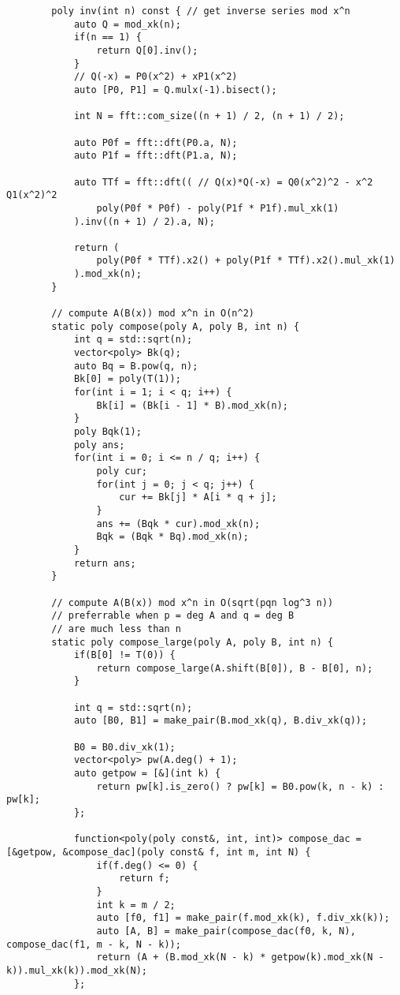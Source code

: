 \begin{lstlisting}
        poly inv(int n) const { // get inverse series mod x^n
            auto Q = mod_xk(n);
            if(n == 1) {
                return Q[0].inv();
            }
            // Q(-x) = P0(x^2) + xP1(x^2)
            auto [P0, P1] = Q.mulx(-1).bisect();
            
            int N = fft::com_size((n + 1) / 2, (n + 1) / 2);
            
            auto P0f = fft::dft(P0.a, N);
            auto P1f = fft::dft(P1.a, N);
            
            auto TTf = fft::dft(( // Q(x)*Q(-x) = Q0(x^2)^2 - x^2 Q1(x^2)^2
                poly(P0f * P0f) - poly(P1f * P1f).mul_xk(1)
            ).inv((n + 1) / 2).a, N);
            
            return (
                poly(P0f * TTf).x2() + poly(P1f * TTf).x2().mul_xk(1)
            ).mod_xk(n);
        }
        
        // compute A(B(x)) mod x^n in O(n^2)
        static poly compose(poly A, poly B, int n) {
            int q = std::sqrt(n);
            vector<poly> Bk(q);
            auto Bq = B.pow(q, n);
            Bk[0] = poly(T(1));
            for(int i = 1; i < q; i++) {
                Bk[i] = (Bk[i - 1] * B).mod_xk(n);
            }
            poly Bqk(1);
            poly ans;
            for(int i = 0; i <= n / q; i++) {
                poly cur;
                for(int j = 0; j < q; j++) {
                    cur += Bk[j] * A[i * q + j];
                }
                ans += (Bqk * cur).mod_xk(n);
                Bqk = (Bqk * Bq).mod_xk(n);
            }
            return ans;
        }
        
        // compute A(B(x)) mod x^n in O(sqrt(pqn log^3 n))
        // preferrable when p = deg A and q = deg B
        // are much less than n
        static poly compose_large(poly A, poly B, int n) {
            if(B[0] != T(0)) {
                return compose_large(A.shift(B[0]), B - B[0], n);
            }
            
            int q = std::sqrt(n);
            auto [B0, B1] = make_pair(B.mod_xk(q), B.div_xk(q));
            
            B0 = B0.div_xk(1);
            vector<poly> pw(A.deg() + 1);
            auto getpow = [&](int k) {
                return pw[k].is_zero() ? pw[k] = B0.pow(k, n - k) : pw[k];
            };
            
            function<poly(poly const&, int, int)> compose_dac = [&getpow, &compose_dac](poly const& f, int m, int N) {
                if(f.deg() <= 0) {
                    return f;
                }
                int k = m / 2;
                auto [f0, f1] = make_pair(f.mod_xk(k), f.div_xk(k));
                auto [A, B] = make_pair(compose_dac(f0, k, N), compose_dac(f1, m - k, N - k));
                return (A + (B.mod_xk(N - k) * getpow(k).mod_xk(N - k)).mul_xk(k)).mod_xk(N);
            };
            

\end{lstlisting}
